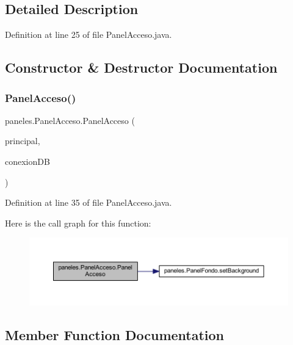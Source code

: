 \subsection{Detailed Description}


Definition at line 25 of file Panel\+Acceso.\+java.



\subsection{Constructor \& Destructor Documentation}
\mbox{\label{classpaneles_1_1_panel_acceso_ab19590219a09f461529209808b8dbd25}} 
\subsubsection{\texorpdfstring{Panel\+Acceso()}{PanelAcceso()}}
{\footnotesize\ttfamily paneles.\+Panel\+Acceso.\+Panel\+Acceso (\begin{DoxyParamCaption}\item[{\mbox{\hyperlink{classvistas_1_1_principal}{Principal}}}]{principal,  }\item[{\mbox{\hyperlink{classmysql_1_1_conexion_j_d_b_c}{Conexion\+J\+D\+BC}}}]{conexion\+DB }\end{DoxyParamCaption})}



Definition at line 35 of file Panel\+Acceso.\+java.

Here is the call graph for this function\+:
\nopagebreak
\begin{figure}[H]
\begin{center}
\leavevmode
\includegraphics[width=350pt]{classpaneles_1_1_panel_acceso_ab19590219a09f461529209808b8dbd25_cgraph}
\end{center}
\end{figure}


\subsection{Member Function Documentation}
\mbox{\label{classpaneles_1_1_panel_acceso_ac978a2c0e1aef22aa66b19abe354b02b}} 
